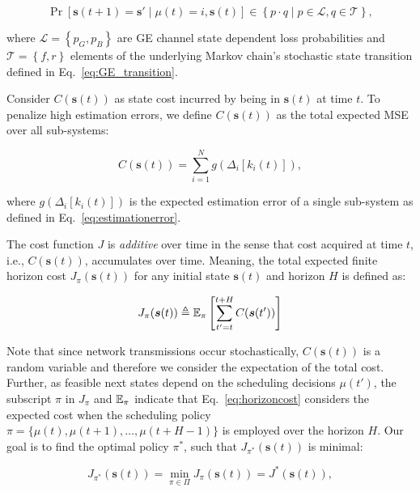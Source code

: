 \begin{equation}
  \label{eq:transition}
  \Pr \left[ \boldsymbol{s}(t+1)=\boldsymbol{s}' \mid \mu(t)=i,\boldsymbol{s}(t)
  \right] \in \left\{ p \cdot q \mid p\in\mathcal{L},q\in\mathcal{T} \right\},
\end{equation}

where $\mathcal{L}=\left\{p_G,p_B\right\}$ are GE channel state dependent loss
probabilities and $\mathcal{T}=\left\{f,r\right\}$ elements of the underlying
Markov chain's stochastic state transition defined in
Eq.~\eqref{eq:GE_transition}.

Consider $C(\boldsymbol{s}(t))$ as state cost incurred by being in
$\boldsymbol{s}(t)$ at time $t$. To penalize high estimation errors, we define
$C(\boldsymbol{s}(t))$ as the total expected MSE over all sub-systems:

\begin{equation}
  \label{eq:gfunction}
  C(\boldsymbol{s}(t)) =  \sum_{i=1}^{N}  g(\Delta_i[k_i(t)]),
\end{equation}

where $g(\Delta_i[k_i(t)])$ is the expected estimation error of a single
sub-system as defined in Eq.~\eqref{eq:estimationerror}. 

The cost function $J$ is \textit{additive} over time in the sense that cost
acquired at time $t$, i.e., $C(\boldsymbol{s}(t))$, accumulates over time.
Meaning, the total expected finite horizon cost $J_{\pi}(\boldsymbol{s} (t))$
for any initial state $\boldsymbol{s}(t)$ and horizon $H$ is defined as:

\begin{equation}
  \label{eq:horizoncost}	
  J_\pi(\boldsymbol{s}(t)) \triangleq \mathbb{E}_\pi \left[ \sum_{t' = t }^{t + H} C(\boldsymbol{s}(t')) \right] 
\end{equation}

Note that since network transmissions occur stochastically,
$C(\boldsymbol{s}(t))$ is a random variable and therefore we consider the
expectation of the total cost. Further, as feasible next states depend on the
scheduling decisions $\mu(t')$, the subscript $\pi$ in $J_\pi$ and $\mathbb{E}_\pi$
indicate that Eq.~\eqref{eq:horizoncost} considers the expected cost when the
scheduling policy $\pi = \{ \mu(t), {\mu(t+1)}, \dots, \mu(t+H-1) \}$ is
employed over the horizon $H$. Our goal is to find the optimal policy $\pi^*$,
such that $J_{\pi^*}(\boldsymbol{s}(t))$ is minimal:

\begin{equation}
\label{eq:minimizationproblem}
	J_{\pi^*}(\boldsymbol{s}(t)) = \min_{\pi \in \Pi} J_\pi (\boldsymbol{s}(t)) = J^*(\boldsymbol{s}(t)),
\end{equation}

